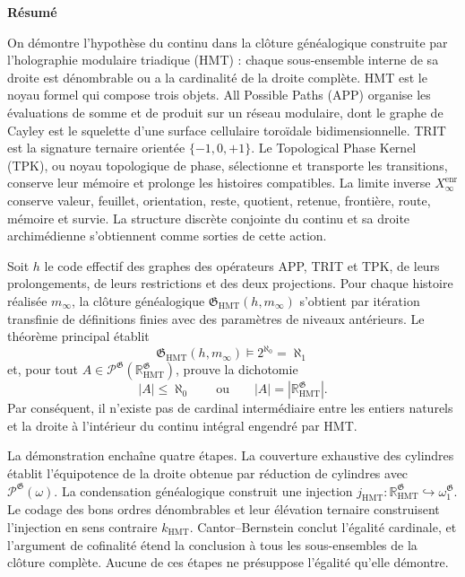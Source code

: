 \begingroup
\begin{center}\textbf{Résumé}\end{center}
\fontsize{9.1}{10.55}\selectfont
\setlength{\parskip}{1.2pt}
\setlength{\abovedisplayskip}{3pt}
\setlength{\belowdisplayskip}{3pt}
On démontre l’hypothèse du continu dans la clôture généalogique construite
par l’holographie modulaire triadique (HMT) : chaque sous-ensemble interne de sa droite est
dénombrable ou a la cardinalité de la droite complète. HMT est le noyau formel
qui compose trois objets. All Possible Paths (APP) organise les évaluations
de somme et de produit sur un réseau modulaire, dont le graphe de Cayley est le
squelette d’une surface cellulaire toroïdale bidimensionnelle. TRIT est la signature
ternaire orientée \(\{-1,0,+1\}\). Le Topological Phase Kernel (TPK), ou noyau
topologique de phase, sélectionne et transporte les transitions, conserve leur
mémoire et prolonge les histoires compatibles. La limite inverse
\(X_\infty^{\mathrm{enr}}\) conserve valeur, feuillet, orientation, reste,
quotient, retenue, frontière, route, mémoire et survie. La structure
discrète conjointe du continu et sa droite archimédienne s’obtiennent comme sorties
de cette action.

Soit \(h\) le code effectif des graphes des opérateurs APP, TRIT et TPK, de leurs prolongements, de leurs restrictions et des deux projections. Pour chaque histoire réalisée \(m_\infty\), la clôture généalogique \(\mathfrak G_{\mathrm{HMT}}(h,m_\infty)\) s'obtient par itération transfinie de définitions finies avec des paramètres de niveaux antérieurs. Le théorème principal établit
\[
 \boxed{\mathfrak G_{\mathrm{HMT}}(h,m_\infty)
 \models 2^{\aleph_0}=\aleph_1}
\]
et, pour tout \(A\in\mathcal P^{\mathfrak G}
(\mathbb R_{\mathrm{HMT}}^{\mathfrak G})\), prouve la dichotomie
\[
 |A|\leq\aleph_0
 \qquad\text{ou}\qquad
 |A|=|\mathbb R_{\mathrm{HMT}}^{\mathfrak G}|.
\]
Par conséquent, il n'existe pas de cardinal intermédiaire entre les entiers naturels et la droite à l'intérieur du continu intégral engendré par HMT.

La démonstration enchaîne quatre étapes. La couverture exhaustive des cylindres établit l'équipotence de la droite obtenue par réduction de cylindres avec \(\mathcal P^{\mathfrak G}(\omega)\). La condensation généalogique construit une injection \(j_{\mathrm{HMT}}:\mathbb R_{\mathrm{HMT}}^{\mathfrak G}
\hookrightarrow\omega_1^{\mathfrak G}\). Le codage des bons ordres dénombrables et leur élévation ternaire construisent l'injection en sens contraire \(k_{\mathrm{HMT}}\). Cantor--Bernstein conclut l'égalité cardinale, et l'argument de cofinalité étend la conclusion à tous les sous-ensembles de la clôture complète. Aucune de ces étapes ne présuppose l'égalité qu'elle démontre.

